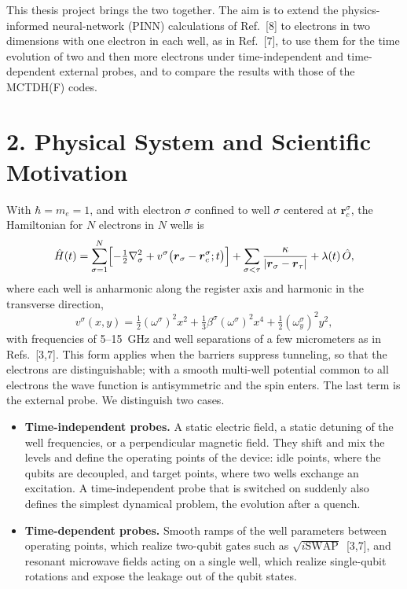 \documentclass[12pt,a4paper]{article}
\begin{document}
This thesis project brings the two together.  The aim is to extend the
physics-informed neural-network (PINN) calculations of Ref.~[8] to
electrons in two dimensions with one electron in each well, as in
Ref.~[7], to use them for the time evolution of two and then more
electrons under time-independent and time-dependent external probes,
and to compare the results with those of the MCTDH(F) codes.

\section*{2. Physical System and Scientific Motivation}

With $\hbar=m_e=1$, and with electron $\sigma$ confined to well
$\sigma$ centered at $\boldsymbol r_c^{\sigma}$, the Hamiltonian for $N$
electrons in $N$ wells is
\[
  \hat H(t)=\sum_{\sigma=1}^{N}\Bigl[-\tfrac12\nabla_\sigma^2
  +v^{\sigma}\bigl(\boldsymbol r_\sigma-\boldsymbol r_c^{\sigma};t\bigr)\Bigr]
  +\sum_{\sigma<\tau}\frac{\kappa}{|\boldsymbol r_\sigma-\boldsymbol r_\tau|}
  +\lambda(t)\,\hat O ,
\]
where each well is anharmonic along the register axis and harmonic in
the transverse direction,
\[
  v^{\sigma}(x,y)=\tfrac12(\omega^{\sigma})^2x^2
  +\tfrac13\beta^{\sigma}(\omega^{\sigma})^2x^4
  +\tfrac12(\omega_y^{\sigma})^2y^2 ,
\]
with frequencies of 5--15~GHz and well separations of a few
micrometers as in Refs.~[3,7].  This form applies when the barriers
suppress tunneling, so that the electrons are distinguishable; with a
smooth multi-well potential common to all electrons the wave function
is antisymmetric and the spin enters.  The last term is the external
probe.
We distinguish two cases.
\begin{itemize}
  \item \textbf{Time-independent probes.}  A static electric field, a
  static detuning of the well frequencies, or a perpendicular magnetic
  field.  They shift and mix the levels and define the operating
  points of the device: idle points, where the qubits are decoupled,
  and target points, where two wells exchange an excitation.  A
  time-independent probe that is switched on suddenly also defines
  the simplest dynamical problem, the evolution after a quench.
  \item \textbf{Time-dependent probes.}  Smooth ramps of the well
  parameters between operating points, which realize two-qubit gates
  such as $\sqrt{i\mathrm{SWAP}}$~[3,7], and resonant microwave fields
  acting on a single well, which realize single-qubit rotations and
  expose the leakage out of the qubit states.
\end{itemize}
\end{document}

